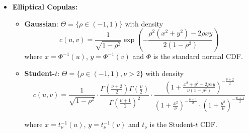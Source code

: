 \begin{itemize}
\item \textbf{Elliptical Copulas:}
   \begin{itemize}
   \item \textbf{Gaussian}: $\Theta = \{\rho \in (-1,1)\}$ with density
$$
c(u, v) = \frac{1}{\sqrt{1-\rho^2}} \exp\left(-\frac{\rho^2(x^2 + y^2) - 2\rho xy}{2(1-\rho^2)}\right)
$$
   where $x = \Phi^{-1}(u)$, $y = \Phi^{-1}(v)$ and $\Phi$ is the standard normal CDF.
   
   \item \textbf{Student-$t$}: $\Theta = \{\rho \in (-1,1), \nu > 2\}$ with density
$$
c(u,v) = \frac{1}{\sqrt{1-\rho^2}} \cdot \frac{\Gamma(\frac{\nu+2}{2})\Gamma(\frac{\nu}{2})}{\Gamma(\frac{\nu+1}{2})^2} \cdot \frac{\left(1 + \frac{x^2 + y^2 - 2\rho xy}{\nu(1-\rho^2)}\right)^{-\frac{\nu+2}{2}}}{\left(1 + \frac{x^2}{\nu}\right)^{-\frac{\nu+1}{2}} \cdot \left(1 + \frac{y^2}{\nu}\right)^{-\frac{\nu+1}{2}}}
$$

   where $x = t_\nu^{-1}(u)$, $y = t_\nu^{-1}(v)$ and $t_\nu$ is the Student-$t$ CDF.
   \end{itemize}	


\end{itemize}
